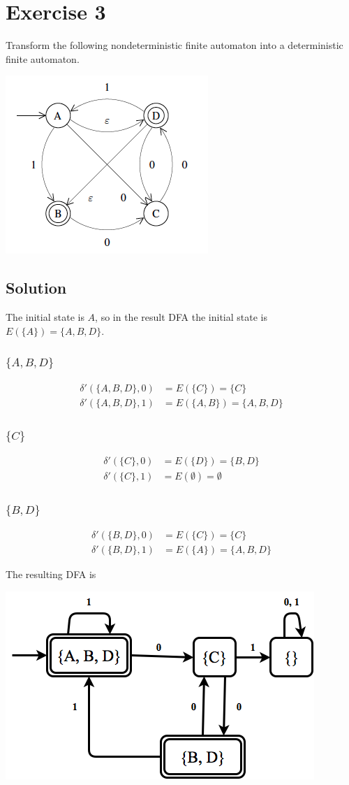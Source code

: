 \documentclass[10pt]{article}
\begin{document}
\section*{Exercise 3}
\color{blue} Transform the following nondeterministic finite automaton into a deterministic finite automaton.
\begin{center}
\includegraphics[scale=0.7]{Exercise3NFA}
\end{center}
\color{black}
\subsection*{Solution}
The initial state is $A$, so in the result DFA the initial state is $E(\{ A \}) = \{ A, B, D \}$.
\subsubsection*{$\{A, B, D\}$}
\begin{align*}
\delta'( \{ A, B, D \}, 0 ) &= E( \{ C \} ) = \{ C \} \\
\delta'( \{ A, B, D \}, 1 ) &= E( \{ A, B \}) = \{ A, B, D \}
\end{align*}
\subsubsection*{$\{ C \}$}
\begin{align*}
\delta'( \{ C \}, 0 ) &= E( \{ D \} ) = \{ B, D \} \\
\delta'( \{ C \}, 1 ) &= E( \emptyset ) = \emptyset
\end{align*}
\subsubsection*{$\{ B, D \}$}
\begin{align*}
\delta'( \{ B, D \}, 0 ) &= E( \{ C \} ) = \{ C \} \\
\delta'( \{ B, D \}, 1 ) &= E( \{ A \} ) = \{ A, B, D \}
\end{align*}

\noindent The resulting DFA is 
\begin{center}
\includegraphics[scale=0.5]{Exercise3DFA}
\end{center}
\end{document}
